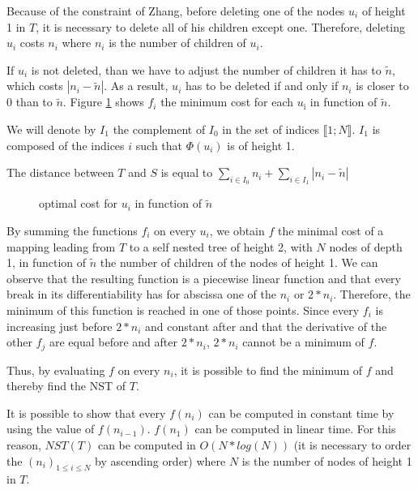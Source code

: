 Because of the constraint of Zhang, before deleting one of the nodes
$u_{i}$ of height 1 in $T$, it is necessary to delete all of his
children except one. Therefore, deleting $u_{i}$ costs $n_{i}$ where
$n_{i}$ is the number of children of $u_{i}$.

If $u_{i}$ is not deleted, than we have to adjust the number of
children it has to $\tilde{n}$, which costs
$\left|n_{i} - \tilde{n}\right|$. As a result, $u_{i}$ has to be
deleted if and only if $n_{i}$ is closer to 0 than to
$\tilde{n}$. Figure \ref{fig:optimalcost} shows $f_{i}$ the minimum
cost for each $u_{î}$ in function of $\tilde{n}$.

We will denote by $I_{1}$ the complement of $I_{0}$ in the set of
indices $\llbracket 1;N \rrbracket$. $I_{1}$ is composed of the
indices $i$ such that $\Phi(u_{i})$ is of height 1.
\begin{remark}
  The distance between $T$ and $S$ is equal to $\sum_{i \in I_{0}}
  n_{i} + \sum_{i \in I_{1}} \left| n_{i} - \tilde{n} \right|$
\end{remark}

\begin{figure}
  \centering
  \caption{optimal cost for $u_{i}$ in function of $\tilde{n}$}
  \label{fig:optimalcost}
\end{figure}

By summing the functions $f_{i}$ on every $u_{i}$, we obtain $f$ the
minimal cost of a mapping leading from $T$ to a self nested tree of
height 2, with $N$ nodes of depth 1, in function of $\tilde{n}$ the
number of children of the nodes of height 1. We can observe that the
resulting function is a piecewise linear function and that every break
in its differentiability has for abscissa one of the $n_{i}$ or
$2*n_{i}$. Therefore, the minimum of this function is reached in one
of those points. Since every $f_{i}$ is increasing just before
$2*n_{i}$ and constant after and that the derivative of the other
$f_{j}$ are equal before and after $2*n_{i}$, $2*n_{i}$ cannot be a
minimum of $f$.

Thus, by evaluating $f$ on every $n_{i}$, it is possible to find the
minimum of $f$ and thereby find the NST of $T$.

It is possible to show that every $f(n_{i})$ can be computed in
constant time by using the value of $f(n_{i-1})$. $f(n_{1})$ can be
computed in linear time. For this reason, $NST(T)$ can be computed in
$O(N*log(N))$ (it is necessary to order the
$(n_{i})_{1 \leqslant i \leqslant N}$ by ascending order) where $N$ is
the number of nodes of height 1 in $T$.

